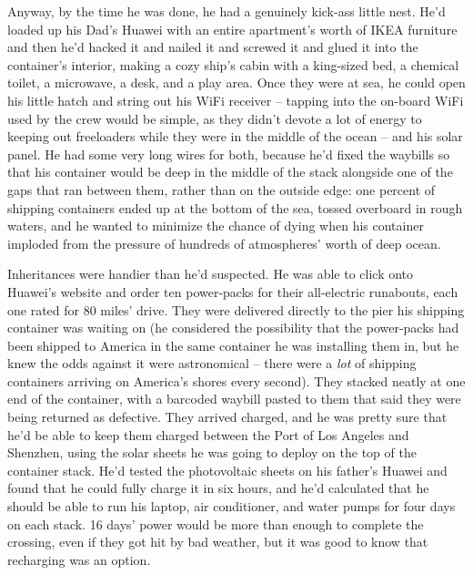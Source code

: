 Anyway, by the time he was done, he had a genuinely kick-ass little
nest. He'd loaded up his Dad's Huawei with an entire apartment's
worth of IKEA furniture and then he'd hacked it and nailed it and
screwed it and glued it into the container's interior, making a
cozy ship's cabin with a king-sized bed, a chemical toilet, a
microwave, a desk, and a play area. Once they were at sea, he could
open his little hatch and string out his WiFi receiver -- tapping
into the on-board WiFi used by the crew would be simple, as they
didn't devote a lot of energy to keeping out freeloaders while they
were in the middle of the ocean -- and his solar panel. He had some
very long wires for both, because he'd fixed the waybills so that
his container would be deep in the middle of the stack alongside
one of the gaps that ran between them, rather than on the outside
edge: one percent of shipping containers ended up at the bottom of
the sea, tossed overboard in rough waters, and he wanted to
minimize the chance of dying when his container imploded from the
pressure of hundreds of atmospheres' worth of deep ocean.

Inheritances were handier than he'd suspected. He was able to click
onto Huawei's website and order ten power-packs for their
all-electric runabouts, each one rated for 80 miles' drive. They
were delivered directly to the pier his shipping container was
waiting on (he considered the possibility that the power-packs had
been shipped to America in the same container he was installing
them in, but he knew the odds against it were astronomical -- there
were a \emph{lot} of shipping containers arriving on America's
shores every second). They stacked neatly at one end of the
container, with a barcoded waybill pasted to them that said they
were being returned as defective. They arrived charged, and he was
pretty sure that he'd be able to keep them charged between the Port
of Los Angeles and Shenzhen, using the solar sheets he was going to
deploy on the top of the container stack. He'd tested the
photovoltaic sheets on his father's Huawei and found that he could
fully charge it in six hours, and he'd calculated that he should be
able to run his laptop, air conditioner, and water pumps for four
days on each stack. 16 days' power would be more than enough to
complete the crossing, even if they got hit by bad weather, but it
was good to know that recharging was an option.

